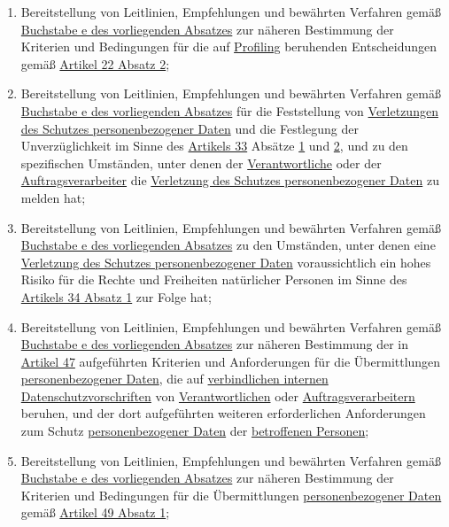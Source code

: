 \begin{enumerate}
\begin{enumerate}
    \item Bereitstellung von Leitlinien, Empfehlungen und bewährten Verfahren gemäß \hyperref[itm:70-1e]{Buchstabe e des
     vorliegenden Absatzes} zur näheren Bestimmung der Kriterien und Bedingungen für die auf \hyperref[itm:04-4]
     {Profiling} beruhenden Entscheidungen gemäß \hyperref[itm:22-2]{Artikel 22 Absatz 2};%
    \label{itm:70-1f}

    \item Bereitstellung von Leitlinien, Empfehlungen und bewährten Verfahren gemäß \hyperref[itm:70-1e]{Buchstabe e des
     vorliegenden Absatzes} für die Feststellung von \hyperref[itm:04-12]{Verletzungen des Schutzes personenbezogener
     Daten} und die Festlegung der Unverzüglichkeit im Sinne des \hyperref[ch:33]{Artikels 33} Absätze \hyperref
     [itm:33-1]{1} und
     \hyperref[itm:33-2]{2}, und zu den spezifischen Umständen, unter denen der \hyperref[itm:04-7]
      {Verantwortliche} oder der
     \hyperref[itm:04-8]{Auftragsverarbeiter} die \hyperref[itm:04-12]{Verletzung des Schutzes personenbezogener Daten}
      zu melden hat;%
    \label{itm:70-1g}

    \item Bereitstellung von Leitlinien, Empfehlungen und bewährten Verfahren gemäß \hyperref[itm:70-1e]{Buchstabe e des
     vorliegenden Absatzes} zu den Umständen, unter denen eine \hyperref[itm:04-12]{Verletzung des Schutzes
     personenbezogener Daten} voraussichtlich ein hohes Risiko für die Rechte und Freiheiten natürlicher Personen im
     Sinne des \hyperref[itm:34-1]{Artikels 34 Absatz 1} zur Folge hat;%
    \label{itm:70-1h}

    \item Bereitstellung von Leitlinien, Empfehlungen und bewährten Verfahren gemäß \hyperref[itm:70-1e]{Buchstabe e des
     vorliegenden Absatzes} zur näheren Bestimmung der in \hyperref[ch:47]{Artikel 47} aufgeführten Kriterien und
     Anforderungen für die Übermittlungen \hyperref[itm:04-1]{personenbezogener Daten}, die auf \hyperref[itm:04-20]
     {verbindlichen internen Datenschutzvorschriften} von \hyperref[itm:04-7]{Verantwortlichen} oder \hyperref
     [itm:04-8]{Auftragsverarbeitern} beruhen, und der dort aufgeführten weiteren erforderlichen Anforderungen zum
     Schutz \hyperref[itm:04-1]{personenbezogener Daten} der \hyperref[itm:04-1]{betroffenen Personen};%
    \label{itm:70-1i}

    \item Bereitstellung von Leitlinien, Empfehlungen und bewährten Verfahren gemäß \hyperref[itm:70-1e]{Buchstabe e des
     vorliegenden Absatzes} zur näheren Bestimmung der Kriterien und Bedingungen für die Übermittlungen
     \hyperref[itm:04-1]{personenbezogener Daten} gemäß \hyperref[itm:49-1-1]{Artikel 49 Absatz 1};%
    \label{itm:70-1j}


\end{enumerate}
\end{enumerate}
